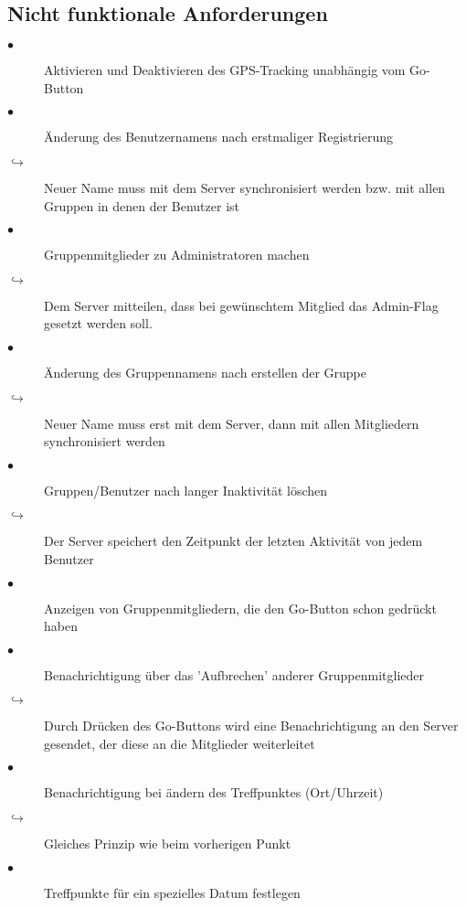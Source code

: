 \subsection{Nicht funktionale Anforderungen}
\begin{description}
\item[$\bullet$] Aktivieren und Deaktivieren des GPS-Tracking unabhängig vom Go-Button
\item[$\bullet$] Änderung des Benutzernamens nach erstmaliger Registrierung
\item[$\hookrightarrow$] Neuer Name muss mit dem Server synchronisiert werden bzw. mit allen Gruppen in denen der Benutzer ist
\item[$\bullet$] Gruppenmitglieder zu Administratoren machen
\item[$\hookrightarrow$] Dem Server mitteilen, dass bei gewünschtem Mitglied das Admin-Flag gesetzt werden soll.
\item[$\bullet$] Änderung des Gruppennamens nach erstellen der Gruppe
\item[$\hookrightarrow$] Neuer Name muss erst mit dem Server, dann mit allen Mitgliedern synchronisiert werden
\item[$\bullet$] Gruppen/Benutzer nach langer Inaktivität löschen
\item[$\hookrightarrow$] Der Server speichert den Zeitpunkt der letzten Aktivität von jedem Benutzer
\item[$\bullet$] Anzeigen von Gruppenmitgliedern, die den Go-Button schon gedrückt haben
\item[$\bullet$] Benachrichtigung über das 'Aufbrechen' anderer Gruppenmitglieder
\item[$\hookrightarrow$] Durch Drücken des Go-Buttons wird eine Benachrichtigung an den Server gesendet, der diese an die Mitglieder weiterleitet
\item[$\bullet$] Benachrichtigung bei ändern des Treffpunktes (Ort/Uhrzeit)
\item[$\hookrightarrow$] Gleiches Prinzip wie beim vorherigen Punkt
\item[$\bullet$] Treffpunkte für ein spezielles Datum festlegen
\end{description}

